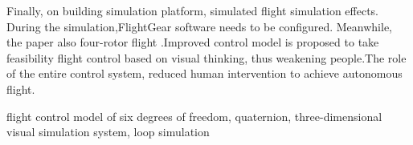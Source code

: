 Finally, on building simulation platform, simulated flight simulation effects. During the simulation,FlightGear software needs to be configured. Meanwhile, the paper also four-rotor flight .Improved control model is proposed to take feasibility flight control based on visual thinking, thus weakening people.The role of the entire control system, reduced human intervention to achieve autonomous flight.

\vspace{1em}
 flight control model of six degrees of freedom, quaternion, three-dimensional visual simulation system, loop simulation
